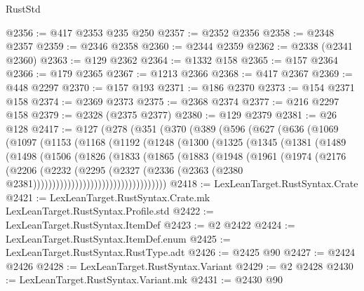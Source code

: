 \begin{lexlean}{RustStd}
\begin{coremodule}
@2356 := @417 @2353 @235 @250
@2357 := @2352 @2356
@2358 := @2348 @2357
@2359 := @2346 @2358
@2360 := @2344 @2359
@2362 := @2338 (@2341 @2360)
@2363 := @129 @2362
@2364 := @1332 @158
@2365 := @157 @2364
@2366 := @179 @2365
@2367 := @1213 @2366
@2368 := @417 @2367
@2369 := @448 @2297
@2370 := @157 @193
@2371 := @186 @2370
@2373 := @154 @2371 @158
@2374 := @2369 @2373
@2375 := @2368 @2374
@2377 := @216 @2297 @158
@2379 := @2328 (@2375 @2377)
@2380 := @129 @2379
@2381 := @26 @128
@2417 := @127
    (@278
      (@351
        (@370
          (@389
            (@596
              (@627
                (@636
                  (@1069
                    (@1097
                      (@1153
                        (@1168
                          (@1192
                            (@1248
                              (@1300
                                (@1325
                                  (@1345
                                    (@1381
                                      (@1489
                                        (@1498
                                          (@1506
                                            (@1826
                                              (@1833
                                                (@1865
                                                  (@1883
                                                    (@1948
                                                      (@1961
                                                        (@1974
                                                          (@2176
                                                            (@2206
                                                              (@2232
                                                                (@2295
                                                                  (@2327
                                                                    (@2336
                                                                      (@2363
                                                                        (@2380
                                                                          @2381)))))))))))))))))))))))))))))))))))
@2418 := LexLeanTarget.RustSyntax.Crate
@2421 := LexLeanTarget.RustSyntax.Crate.mk LexLeanTarget.RustSyntax.Profile.std
@2422 := LexLeanTarget.RustSyntax.ItemDef
@2423 := @2 @2422
@2424 := LexLeanTarget.RustSyntax.ItemDef.enum
@2425 := LexLeanTarget.RustSyntax.RustType.adt
@2426 := @2425 @90
@2427 := @2424 @2426
@2428 := LexLeanTarget.RustSyntax.Variant
@2429 := @2 @2428
@2430 := LexLeanTarget.RustSyntax.Variant.mk
@2431 := @2430 @90

\end{coremodule}
\end{lexlean}
